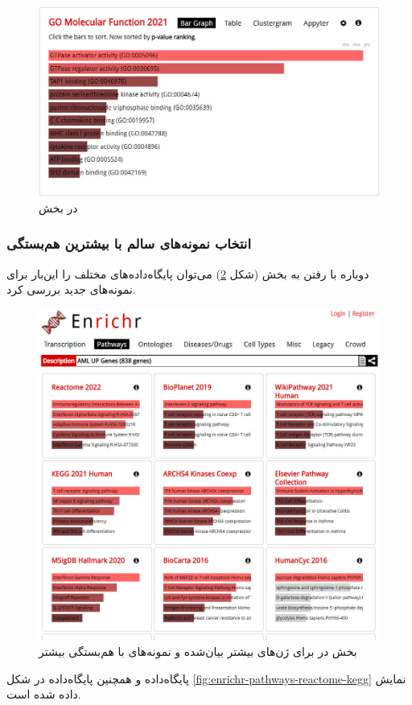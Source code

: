\documentclass{article}
\begin{document}
\begin{figure}[h!]
	\centering
	\includegraphics[width=0.5\columnwidth]{figs/enrichr-ontologies-mf.jpg}
	\caption{ در بخش }
	\label{fig:enrichr-ontology-mf}
\end{figure}

\subsubsection{انتخاب نمونه‌های سالم با بیشترین هم‌بستگی}
دوباره با رفتن به بخش  (شکل \ref{fig:enrichr-pathways-2}) می‌توان پایگاه‌داده‌های  مختلف را این‌بار برای نمونه‌های جدید بررسی کرد.
\begin{figure}[h!]
	\centering
	\includegraphics[width=0.5\columnwidth]{figs/enrichr-pathways-2.jpg}
	\caption{بخش  در  برای ژن‌های بیشتر بیان‌شده و نمونه‌های با هم‌بستگی بیشتر}
	\label{fig:enrichr-pathways-2}
\end{figure}

پایگاه‌داده  و همچنین پایگاه‌داده  در شکل \ref{fig:enrichr-pathways-reactome-kegg} نمایش داده شده است.
\end{document}
